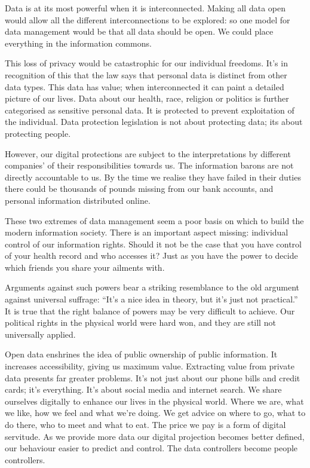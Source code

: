 \documentclass[a4paper]{caesar_book}
\begin{document}
Data is at its most powerful when it is interconnected. Making all data open would allow all the different interconnections to be explored: so one model for data management would be that all data should be open. We could place everything in the information commons.

This loss of privacy would be catastrophic for our individual freedoms. It’s in recognition of this that the law says that personal data is distinct from other data types. This data has value; when interconnected it can paint a detailed picture of our lives. Data about our health, race, religion or politics is further categorised as sensitive personal data. It is protected to prevent exploitation of the individual. Data protection legislation is not about protecting data; its about protecting people.

However, our digital protections are subject to the interpretations by different companies’ of their responsibilities towards us. The information barons are not directly accountable to us. By the time we realise they have failed in their duties there could be thousands of pounds missing from our bank accounts, and personal information distributed online.

These two extremes of data management seem a poor basis on which to build the modern information society. There is an important aspect missing: individual control of our information rights. Should it not be the case that you have control of your health record and who accesses it? Just as you have the power to decide which friends you share your ailments with.

Arguments against such powers bear a striking resemblance to the old argument against universal suffrage: “It’s a nice idea in theory, but it’s just not practical.” It is true that the right balance of powers may be very difficult to achieve. Our political rights in the physical world were hard won, and they are still not universally applied.

Open data enshrines the idea of public ownership of public information. It increases accessibility, giving us maximum value. Extracting value from private data presents far greater problems. It’s not just about our phone bills and credit cards; it’s everything. It’s about social media and internet search. We share ourselves digitally to enhance our lives in the physical world. Where we are, what we like, how we feel and what we’re doing. We get advice on where to go, what to do there, who to meet and what to eat. The price we pay is a form of digital servitude. As we provide more data our digital projection becomes better defined, our behaviour easier to predict and control. The data controllers become people controllers.
\end{document}
